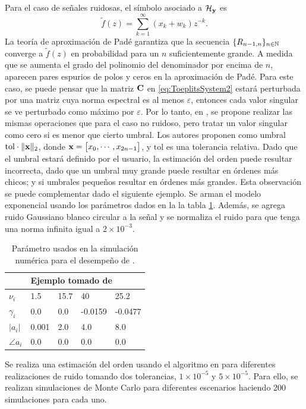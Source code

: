 	Para el caso de señales ruidosas, el símbolo asociado a $\mathcal{H}_{\mathbf{y}}$ es
	\[\tilde{f}(z) = \sum_{k=1}^{\infty}(x_k+w_k)z^{-k}.\]
	La teoría de aproximación de Padé garantiza que la secuencia $\{R_{n-1,n}\}_{n\in\mathbb{N}}$ converge a $\tilde{f}(z)$ en probabilidad para un $n$ suficientemente grande. A medida que se aumenta el grado del polinomio del denominador por encima de $n$, aparecen pares espurios de polos y ceros en la aproximación de Padé. Para este caso, se puede pensar que la matriz $\mathbf{C}$ en \eqref{eq:ToeplitsSystem2} estará perturbada por una matriz cuya norma espectral es al menos $\varepsilon$, entonces cada valor singular se ve perturbado como máximo por $\varepsilon$.  Por lo tanto, en \cite{Gonnet2013}, se propone realizar las mismas operaciones que para el caso no ruidoso, pero tratar un valor singular como cero si es menor que cierto umbral. Los autores proponen como umbral $\mathrm{tol}\cdot\|\mathbf{x}\|_2$, donde $\mathbf{x}=\big[x_0,\cdots,x_{2n-1}\big]$, y $\mathrm{tol}$ es una tolerancia relativa. Dado que el umbral estará definido por el usuario, la estimación del orden puede resultar incorrecta, dado que un umbral muy grande puede resultar en órdenes más chicos; y si umbrales pequeños resultar en órdenes más grandes. Esta observación se puede complementar dado el siguiente ejemplo. Se arman el modelo exponencial usando los parámetros dados en la la tabla \ref{Tab:vexpa_parameters_pade}. 	Además, se agrega ruido Gaussiano blanco circular a la señal y se normaliza el ruido para que tenga una norma infinita igual a $2\times 10^{-3}$.  
	
	\begin{table}[ht]
		\centering
		\begin{tabular}{l|llll}
			& \multicolumn{4}{l}{Ejemplo tomado de \cite{Cuyt2018}}  \\ \hline
			$\nu_i$        & 1.5  & 15.7   & 40   & 25.2    \\
			$\gamma_i$     & 0.0  & 0.0    & -0.0159 & -0.0477 \\ 
			$|a_i|$      & 0.001 & 2.0     & 4.0     & 8.0    \\
			$\angle a_i$ & 0.0    & 0.0    & 0.0    & 0.0    \\ \hline
		\end{tabular}
		\caption{Parámetro usados en la simulación numérica para el desempeño de \cite{Gonnet2013}.}
		\label{Tab:vexpa_parameters_pade}
	\end{table}

	Se realiza una estimación del orden usando el algoritmo en \cite{Gonnet2013} para diferentes realizaciones de ruido tomando dos tolerancias, $1\times 10^{-5}$ y $5\times 10^{-5}$. Para ello, se realizan simulaciones de Monte Carlo para diferentes escenarios haciendo 200 simulaciones para cada uno.
	
